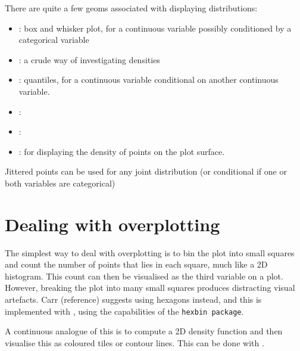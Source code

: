 There are quite a few geoms associated with displaying distributions:

\begin{itemize}
	\item {}: box and whisker plot, for a continuous variable possibly conditioned by a categorical variable
	\item {}: a crude way of investigating densities
	\item {}: quantiles, for a continuous variable conditional on another continuous variable.
	\item {}: 
	\item {}: 
	\item {}: for displaying the density of points on the plot surface.
\end{itemize}

% 
% 
%   
% 
% 

Jittered points can be used for any joint distribution (or conditional if one or both variables are categorical)

\section{Dealing with overplotting}
\label{sec:overplotting}

The simplest way to deal with overplotting is to bin the plot into small squares and count the number of points that lies in each square, much like a 2D histogram.  This count can then be visualised as the third variable on a plot.  However, breaking the plot into many small squares produces distracting visual artefacts.  Carr (reference) suggests using hexagons instead, and this is implemented with , using the capabilities of the {\tt hexbin package}.

A continuous analogue of this is to compute a 2D density function and then visualise this as coloured tiles or contour lines.  This can be done with .

